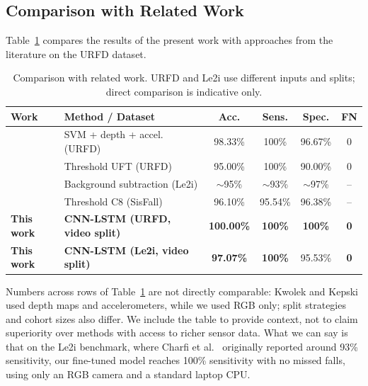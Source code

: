 \documentclass[runningheads]{llncs}
\begin{document}
\subsection{Comparison with Related Work}

Table~\ref{tab:comparison} compares the results of the present work with approaches from the literature on the URFD dataset.

\begin{table}
\centering
\caption{Comparison with related work. URFD and Le2i use different inputs and splits; direct comparison is indicative only.}\label{tab:comparison}
\begin{tabular}{|l|l|c|c|c|c|}
\hline
\textbf{Work} & \textbf{Method / Dataset} & \textbf{Acc.} & \textbf{Sens.} & \textbf{Spec.} & \textbf{FN} \\
\hline
\cite{kwolek2014} & SVM + depth + accel. (URFD) & 98.33\% & 100\% & 96.67\% & 0 \\
\cite{kwolek2014} & Threshold UFT (URFD) & 95.00\% & 100\% & 90.00\% & 0 \\
\cite{charfi2013}  & Background subtraction (Le2i) & $\sim$95\% & $\sim$93\% & $\sim$97\% & -- \\
\cite{sisfall2017} & Threshold C8 (SisFall) & 96.10\% & 95.54\% & 96.38\% & -- \\
\textbf{This work} & \textbf{CNN-LSTM (URFD, video split)} & \textbf{100.00\%} & \textbf{100\%} & \textbf{100\%} & \textbf{0} \\
\textbf{This work} & \textbf{CNN-LSTM (Le2i, video split)} & \textbf{97.07\%} & \textbf{100\%} & 95.53\% & \textbf{0} \\
\hline
\end{tabular}
\end{table}

Numbers across rows of Table~\ref{tab:comparison} are not directly comparable: Kwolek and Kepski used depth maps and accelerometers, while we used RGB only; split strategies and cohort sizes also differ. We include the table to provide context, not to claim superiority over methods with access to richer sensor data. What we can say is that on the Le2i benchmark, where Charfi et al.~\cite{charfi2013} originally reported around 93\% sensitivity, our fine-tuned model reaches 100\% sensitivity with no missed falls, using only an RGB camera and a standard laptop CPU.
\end{document}
